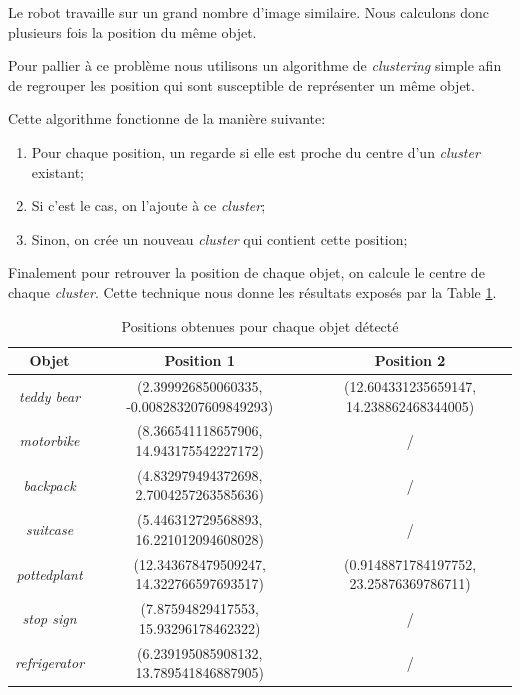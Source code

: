 \documentclass[10pt,a4paper]{article}
\begin{document}
   			Le robot travaille sur un grand nombre d'image similaire. Nous calculons donc plusieurs fois la position du même objet.
   			
   			Pour pallier à ce problème nous utilisons un algorithme de \textit{clustering} simple afin de regrouper les position qui sont susceptible de représenter un même objet.
   			
   			Cette algorithme fonctionne de la manière suivante:
   			\begin{enumerate}
   				\item Pour chaque position, un regarde si elle est proche du centre d'un \textit{cluster} existant;
   				\item Si c'est le cas, on l'ajoute à ce \textit{cluster};
   				\item Sinon, on crée un nouveau \textit{cluster} qui contient cette position;
   			\end{enumerate}
   		
   			Finalement pour retrouver la position de chaque objet, on calcule le centre de chaque \textit{cluster}. Cette technique nous donne les résultats exposés par la Table \ref{tab:res}.
   	
   		\begin{table}[h]
   			\begin{center}
   				\begin{tabular}{|c|c|c|}
   					\hline
   					Objet & Position 1 & Position 2\\
   					\hline
   					\textit{teddy bear} & (2.399926850060335, -0.008283207609849293)& (12.604331235659147, 14.238862468344005) \\
   					\hline
   					\textit{motorbike} & (8.366541118657906, 14.943175542227172) & / \\
   					\hline
   					\textit{backpack}& (4.832979494372698, 2.7004257263585636) & / \\
   					\hline
   					\textit{suitcase} & (5.446312729568893, 16.221012094608028) & / \\
   					\hline
   					\textit{pottedplant} & (12.343678479509247, 14.322766597693517) & (0.9148871784197752, 23.25876369786711) \\
   					\hline
   					\textit{stop sign} & (7.87594829417553, 15.93296178462322) & / \\
   					\hline
   					\textit{refrigerator} & (6.239195085908132, 13.789541846887905) & / \\
   					\hline
   				\end{tabular}
   			\end{center}
   			\caption{Positions obtenues pour chaque objet détecté}
   			\label{tab:res}
   		\end{table}
   	
\end{document}
